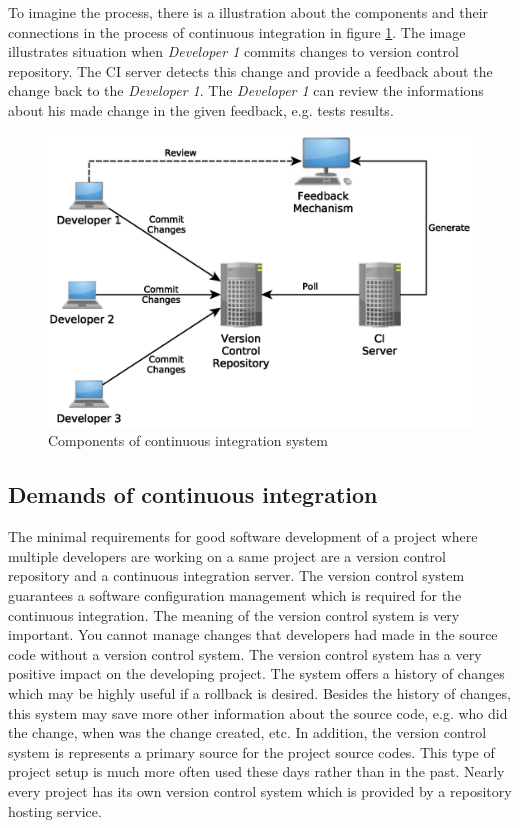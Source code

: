 To imagine the process, there is a illustration about the components and their connections in the process of continuous integration in figure \ref{fig:cocis}. The image illustrates situation when \textit{Developer 1} commits changes to version control repository. The CI server detects this change and provide a feedback about the change back to the \textit{Developer 1}. The \textit{Developer 1} can review the informations about his made change in the given feedback, e.g. tests results.

\begin{figure}[H]
	\centering
	\includegraphics[scale=0.6]{yEd/components_of_CI_system.eps}
	\caption{Components of continuous integration system\cite{CIPD}}
	\label{fig:cocis}
\end{figure}

\subsection{Demands of continuous integration}
The minimal requirements for good software development of a project where multiple developers are working on a same project are a version control repository and a continuous integration server. The version control system guarantees a software configuration management which is required for the continuous integration. The meaning of the version control system is very important. You cannot manage changes that developers had made in the source code without a version control system. The version control system has a very positive impact on the developing project. The system offers a history of changes which may be highly useful if a rollback is desired. Besides the history of changes, this system may save more other information about the source code, e.g. who did the change, when was the change created, etc. In addition, the version control system is represents a primary source for the project source codes. This type of project setup is much more often used these days rather than in the past. Nearly every project has its own version control system which is provided by a repository hosting service.\\

